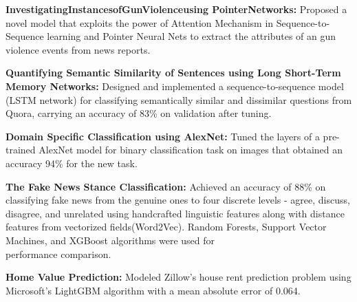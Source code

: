 \begin{cventries}
\vspace{-5mm}
  \cventry
    {}
    {}
    {}
    {}
    {
      \begin{cvitems}
      \item {{ \textbf{Investigating​Instances​of​Gun​Violence​using Pointer​Networks:} Proposed a novel model that exploits the power of Attention Mechanism in Sequence-to-Sequence learning and Pointer Neural Nets to extract the attributes of an gun violence events from news reports.}}
      \item {{ \textbf{Quantifying Semantic Similarity of Sentences using Long Short-Term Memory Networks:} Designed and implemented a sequence-to-sequence model (LSTM network) for classifying semantically similar and dissimilar questions from Quora, carrying an accuracy of 83\% on validation after tuning.}}
      \item {{\textbf{Domain Specific Classification using AlexNet:} Tuned the layers of a pre-trained AlexNet model for binary classification task on images that obtained an accuracy 94\% for the new task.}}
      \item { \textbf{The Fake News Stance Classification:} Achieved an accuracy of 88\% on classifying fake news from the genuine ones to four discrete levels - agree, discuss, disagree, and unrelated using handcrafted linguistic features along with distance features from vectorized fields(Word2Vec). Random Forests, Support Vector Machines, and XGBoost algorithms were used for \\ performance comparison.}
      \item { \textbf{Home Value Prediction:} Modeled Zillow's house rent prediction problem using Microsoft's LightGBM algorithm with a mean absolute error of 0.064.}
      \end{cvitems}
    }
\end{cventries}
